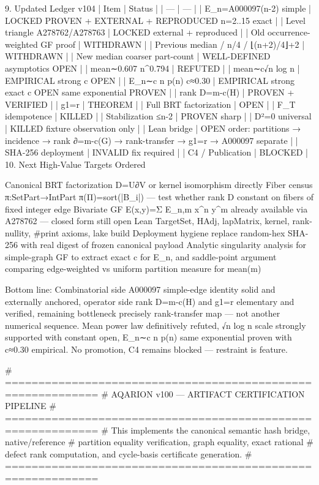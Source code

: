 9. Updated Ledger v104
| Item | Status |
| --- | --- |
| E_n=A000097(n-2) simple | LOCKED PROVEN + EXTERNAL + REPRODUCED n=2..15 exact |
| Level triangle A278762/A278763 | LOCKED external + reproduced |
| Old occurrence-weighted GF proof | WITHDRAWN |
| Previous median / n/4 / ⌊(n+2)/4⌋+2 | WITHDRAWN |
| New median coarser part-count | WELL-DEFINED asymptotics OPEN |
| mean∼0.607 n^0.794 | REFUTED |
| mean∼c√n log n | EMPIRICAL strong c OPEN |
| E_n∼c n p(n) c≈0.30 | EMPIRICAL strong exact c OPEN same exponential PROVEN |
| rank D=m-c(H) | PROVEN + VERIFIED |
| g1=r | THEOREM |
| Full BRT factorization | OPEN |
| F_T idempotence | KILLED |
| Stabilization ≤n-2 | PROVEN sharp |
| D²=0 universal | KILLED fixture observation only |
| Lean bridge | OPEN order: partitions → incidence → rank ∂=m-c(G) → rank-transfer → g1=r → A000097 separate |
| SHA-256 deployment | INVALID fix required |
| C4 / Publication | BLOCKED |
10. Next High-Value Targets Ordered

Canonical BRT factorization D=U∂V or kernel isomorphism directly
Fiber census π:SetPart→IntPart π(Π)=sort(|B_i|) — test whether rank D constant on fibers of fixed integer edge
Bivariate GF E(x,y)=Σ E_{n,m} x^n y^m already available via A278762 — closed form still open
Lean TargetSet, HAdj, lapMatrix, kernel, rank-nullity, #print axioms, lake build
Deployment hygiene replace random-hex SHA-256 with real digest of frozen canonical payload
Analytic singularity analysis for simple-graph GF to extract exact c for E_n, and saddle-point argument comparing edge-weighted vs uniform partition measure for mean(m)

Bottom line: Combinatorial side A000097 simple-edge identity solid and externally anchored, operator side rank D=m-c(H) and g1=r elementary and verified, remaining bottleneck precisely rank-transfer map — not another numerical sequence. Mean power law definitively refuted, √n log n scale strongly supported with constant open, E_n∼c n p(n) same exponential proven with c≈0.30 empirical. No promotion, C4 remains blocked — restraint is feature.

# ============================================================
# AQARION v100 — ARTIFACT CERTIFICATION PIPELINE
# ============================================================
# This implements the canonical semantic hash bridge, native/reference
# partition equality verification, graph equality, exact rational
# defect rank computation, and cycle-basis certificate generation.
# ============================================================

